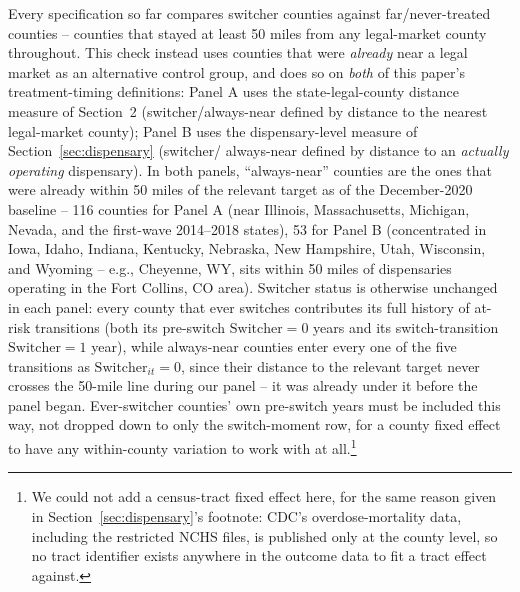 \documentclass[preprint,12pt,authoryear]{elsarticle}
\begin{document}
Every specification so far compares switcher counties against
far/never-treated counties -- counties that stayed at least 50 miles
from any legal-market county throughout. This check instead uses
counties that were \emph{already} near a legal market as an
alternative control group, and does so on \emph{both} of this paper's
treatment-timing definitions: Panel A uses the state-legal-county
distance measure of Section~2 (switcher/always-near defined by
distance to the nearest legal-market county); Panel B uses the
dispensary-level measure of Section~\ref{sec:dispensary} (switcher/
always-near defined by distance to an \emph{actually operating}
dispensary). In both panels, ``always-near'' counties are the ones that
were already within 50 miles of the relevant target as of the
December-2020 baseline -- 116 counties for Panel A (near Illinois,
Massachusetts, Michigan, Nevada, and the first-wave 2014--2018 states),
53 for Panel B (concentrated in Iowa, Idaho, Indiana, Kentucky,
Nebraska, New Hampshire, Utah, Wisconsin, and Wyoming -- e.g., Cheyenne,
WY, sits within 50 miles of dispensaries operating in the Fort Collins,
CO area). Switcher status is otherwise unchanged in each panel: every
county that ever switches contributes its full history of at-risk
transitions (both its pre-switch $\text{Switcher}=0$ years and its
switch-transition $\text{Switcher}=1$ year), while always-near counties
enter every one of the five transitions as $\text{Switcher}_{it}=0$,
since their distance to the relevant target never crosses the 50-mile
line during our panel -- it was already under it before the panel
began. Ever-switcher counties' own pre-switch years must be included
this way, not dropped down to only the switch-moment row, for a county
fixed effect to have any within-county variation to work with at
all.\footnote{We could not add a census-tract fixed effect here, for
the same reason given in Section~\ref{sec:dispensary}'s footnote: CDC's
overdose-mortality data, including the restricted NCHS files, is
published only at the county level, so no tract identifier exists
anywhere in the outcome data to fit a tract effect against.}
\end{document}
